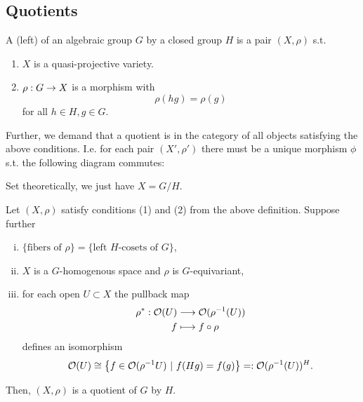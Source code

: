 \subsection{Quotients}
\begin{definition}
	A (left)  of an algebraic group $G$ by a closed group $H$ is a pair $(X, \rho)$ s.t.
	\begin{enumerate}[(1)]
		\item $X$ is a quasi-projective variety.
		\item $\rho : G \overset{}{\rightarrow} X$ is a morphism with
		\[ \rho(hg) = \rho(g) \]
		for all $h \in H, g \in G$.
	\end{enumerate}
Further, we demand that a quotient is  in the category of all objects satisfying the above conditions. I.e. for each pair $(X', \rho')$ there must be a unique morphism $\phi$ s.t. the following diagram commutes:
\begin{center}
\end{center}
\end{definition}
\begin{remark}
	Set theoretically, we just have $X = G/H$.
\end{remark}
\begin{lemma}
	Let $(X,\rho)$ satisfy conditions (1) and (2) from the above definition. Suppose further
	\begin{enumerate}[(i)]
		\item $\{ \text{fibers of } \rho \} = \{ \text{left }H\text{-cosets of }G \}$,
		\item $X$ is a $G$-homogenous space and $\rho$ is $G$-equivariant,
		\item for each open $U \subset X$ the pullback map
		\begin{align*}
		\rho^* : \mathcal{O}(U) & \overset{}{\longrightarrow} \mathcal{O}(\rho^{-1} (U))\\
		f &\longmapsto f \circ \rho
		\end{align*}
		defines an isomorphism
		\[ \mathcal{O}(U) \overset{}{\cong} \left\lbrace f \in \mathcal{O}(\rho^{-1} U) ~ | ~ f(Hg) = f(g)\right\rbrace =: \mathcal{O}(\rho^{-1}(U))^H. \]
	\end{enumerate}
Then, $(X,\rho)$ is a quotient of $G$ by $H$.
\end{lemma}
